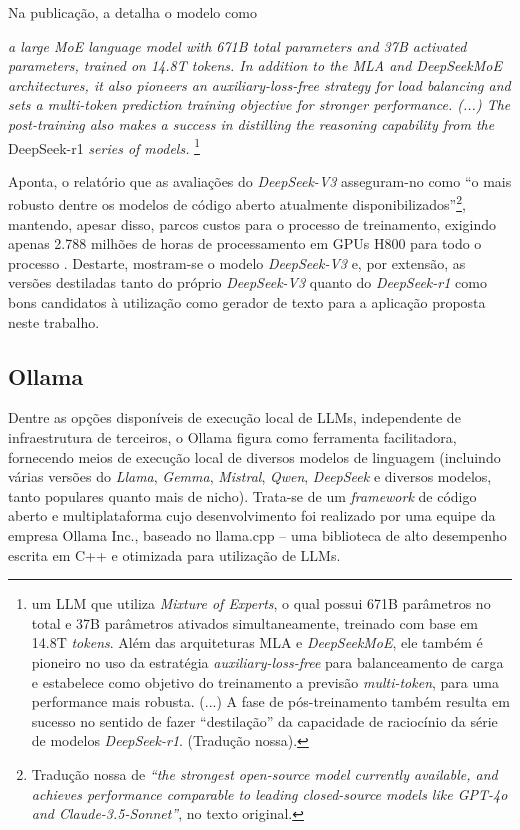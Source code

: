 Na publicação, a  detalha o modelo como

\begin{citacao}
    \textit{a large MoE language model with 671B total parameters and 37B activated parameters, trained on 14.8T tokens. In addition to the MLA and DeepSeekMoE architectures, it also pioneers an auxiliary-loss-free strategy for load balancing and sets a multi-token prediction training objective for stronger performance. (...) The post-training also makes a success in distilling the reasoning capability from the }DeepSeek-r1\textit{ series of models.}
    \footnote{um \ac{LLM} que utiliza \textit{Mixture of Experts}, o qual possui 671B parâmetros no total e 37B parâmetros ativados simultaneamente, treinado com base em 14.8T \textit{tokens}. Além das arquiteturas MLA e \textit{DeepSeekMoE}, ele também é pioneiro no uso da estratégia \textit{auxiliary-loss-free} para balanceamento de carga e estabelece como objetivo do treinamento a previsão \textit{multi-token}, para uma performance mais robusta. (...) A fase de pós-treinamento também resulta em sucesso no sentido de fazer ``destilação'' da capacidade de raciocínio da série de modelos \textit{DeepSeek-r1}. (Tradução nossa).}
\end{citacao}

Aponta, o relatório que as avaliações do \textit{DeepSeek-V3} asseguram-no como ``o mais robusto dentre os modelos de código aberto atualmente disponibilizados''\footnote{Tradução nossa de \textit{``the strongest open-source model currently available, and achieves performance comparable to leading closed-source models like GPT-4o and Claude-3.5-Sonnet''}, no texto original.}, mantendo, apesar disso, parcos custos para o processo de treinamento, exigindo apenas 2.788 milhões de horas de processamento em GPUs H800 para todo o processo \cite{DeepSeek:2}. Destarte, mostram-se o modelo \textit{DeepSeek-V3} e, por extensão, as versões destiladas tanto do próprio \textit{DeepSeek-V3} quanto do \textit{DeepSeek-r1} \cite{DeepSeek:3} como bons candidatos à utilização como gerador de texto para a aplicação proposta neste trabalho.

\subsection{Ollama}
\label{subsec:Assistente.2.3}
Dentre as opções disponíveis de execução local de \ac{LLM}s, independente de infraestrutura de terceiros, o Ollama figura como ferramenta facilitadora, fornecendo meios de execução local de diversos modelos de linguagem (incluindo várias versões do \textit{Llama}, \textit{Gemma}, \textit{Mistral}, \textit{Qwen}, \textit{DeepSeek} e diversos modelos, tanto populares quanto mais de nicho). Trata-se de um \textit{framework} de código aberto e multiplataforma cujo desenvolvimento foi realizado por uma equipe da empresa Ollama Inc., baseado no llama.cpp -- uma biblioteca de alto desempenho escrita em C++ e otimizada para utilização de \ac{LLM}s.

